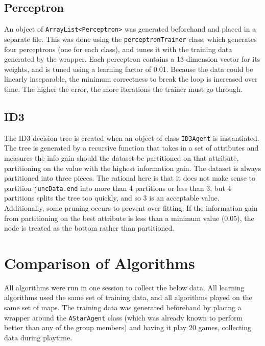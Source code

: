 \documentclass[a4paper]{article}
\begin{document}
\subsection{Perceptron}
An object of \texttt{ArrayList<Perceptron>} was generated beforehand and placed in a separate file.  This was done using the \texttt{perceptronTrainer} class, which generates four perceptrons (one for each class), and tunes it with the training data generated by the wrapper.  Each perceptron contains a 13-dimension vector for its weights, and is tuned using a learning factor of 0.01.  Because the data could be linearly inseparable, the minimum correctness to break the loop is increased over time.  The higher the error, the more iterations the trainer must go through.


\subsection{ID3}
The ID3 decision tree is created when an object of class \texttt{ID3Agent} is instantiated.  The tree is generated by a recursive function that takes in a set of attributes and measures the info gain should the dataset be partitioned on that attribute, partitioning on the value with the highest information gain.  The dataset is always partitioned into three pieces.  The rational here is that it does not make sense to partition \texttt{juncData.end} into more than 4 partitions or less than 3, but 4 partitions splits the tree too quickly, and so 3 is an acceptable value.  Additionally, some pruning occurs to prevent over fitting.  If the information gain from partitioning on the best attribute is less than a minimum value (0.05), the node is treated as the bottom rather than partitioned.  

\section{Comparison of Algorithms}

All algorithms were run in one session to collect the below data.  All learning algorithms used the same set of training data, and all algorithms played on the same set of maps.  The training data was generated beforehand by placing a wrapper around the \texttt{AStarAgent} class (which was already known to perform better than any of the group members) and having it play 20 games, collecting data during playtime.  
\end{document}
